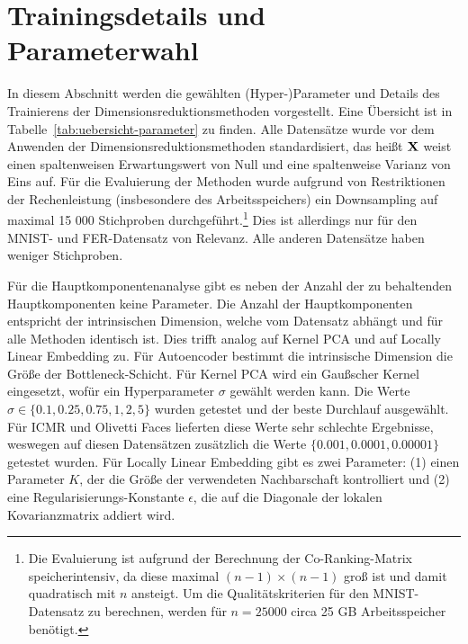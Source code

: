\section{Trainingsdetails und Parameterwahl}
\label{ch:Vergleich:sec:ParameterwahlTrainingsdetails}

In diesem Abschnitt werden die gewählten (Hyper-)Parameter und Details des Trainierens der
Dimensionsreduktionsmethoden vorgestellt. Eine Übersicht ist in
Tabelle~\ref{tab:uebersicht-parameter} zu finden. Alle Datensätze wurde vor dem Anwenden der
Dimensionsreduktionsmethoden standardisiert, das heißt $\mathbf{X}$ weist einen spaltenweisen
Erwartungswert von Null und eine spaltenweise Varianz von Eins auf. Für die Evaluierung der
Methoden wurde aufgrund von Restriktionen der Rechenleistung (insbesondere des Arbeitsspeichers)
ein Downsampling auf maximal 15 000 Stichproben durchgeführt.\footnote{Die Evaluierung ist aufgrund
	der Berechnung der Co-Ranking-Matrix speicherintensiv, da diese maximal $(n-1) \times (n-1)$ groß
	ist und damit quadratisch mit $n$ ansteigt. Um die Qualitätskriterien für den MNIST-Datensatz zu
	berechnen, werden für $n=25 000$ circa 25 GB Arbeitsspeicher benötigt.} Dies ist allerdings nur für
den MNIST- und FER-Datensatz von Relevanz. Alle anderen Datensätze haben weniger Stichproben.

Für die Hauptkomponentenanalyse gibt es neben der Anzahl der zu behaltenden Hauptkomponenten keine
Parameter. Die Anzahl der Hauptkomponenten entspricht der intrinsischen Dimension, welche vom
Datensatz abhängt und für alle Methoden identisch ist. Dies trifft analog auf Kernel PCA und auf
Locally Linear Embedding zu. Für Autoencoder bestimmt die intrinsische Dimension die Größe der
Bottleneck-Schicht. Für Kernel PCA wird ein Gaußscher Kernel eingesetzt, wofür ein Hyperparameter
$\sigma$ gewählt werden kann. Die Werte $\sigma \in \{ 0.1, 0.25, 0.75, 1, 2, 5\}$ wurden getestet
und der beste Durchlauf ausgewählt. Für ICMR und Olivetti Faces lieferten diese Werte sehr
schlechte Ergebnisse, weswegen auf diesen Datensätzen zusätzlich die Werte $\{ 0.001, 0.0001,
	0.00001\}$ getestet wurden. Für Locally Linear Embedding gibt es zwei Parameter: (1) einen
Parameter $K$, der die Größe der verwendeten Nachbarschaft kontrolliert und (2) eine
Regularisierungs-Konstante $\epsilon$, die auf die Diagonale der lokalen Kovarianzmatrix addiert
wird.


